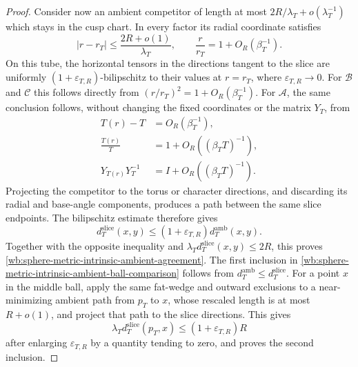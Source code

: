 \begin{proof}
Consider now an ambient competitor of length at most
\(2R/\lambda_T+o(\lambda_T^{-1})\) which stays in the cusp chart.  In every
factor its radial coordinate satisfies
\[
 |r-r_T|\leq \frac{2R+o(1)}{\lambda_T},
 \qquad
 \frac r{r_T}=1+O_R(\beta_T^{-1}).
\]
On this tube, the horizontal tensors in the directions tangent to the slice
are uniformly \((1+\varepsilon_{T,R})\)-bilipschitz to their values at
\(r=r_T\), where \(\varepsilon_{T,R}\to0\).  For
\(\mathcal B\) and \(\mathcal C\) this follows directly from
\((r/r_T)^2=1+O_R(\beta_T^{-1})\).  For \(\mathcal A\), the same conclusion
follows, without changing the fixed coordinates or the matrix \(Y_T\), from
\[
 \begin{aligned}
  T(r)-T&=O_R(\beta_T^{-1}),\\
  \frac{T(r)}T&=1+O_R((\beta_TT)^{-1}),\\
  Y_{T(r)}Y_T^{-1}&=I+O_R((\beta_TT)^{-1}).
 \end{aligned}
\]
Projecting the competitor to the torus or character directions, and
discarding its radial and base-angle components, produces a path between
the same slice endpoints.  The bilipschitz estimate therefore gives
\[
 d_T^{\mathrm{slice}}(x,y)
 \leq(1+\varepsilon_{T,R})d_T^{\mathrm{amb}}(x,y).
\]
Together with the opposite inequality and
\(\lambda_Td_T^{\mathrm{slice}}(x,y)\leq2R\), this proves
\eqref{wb:sphere-metric-intrinsic-ambient-agreement}.  The first inclusion in
\eqref{wb:sphere-metric-intrinsic-ambient-ball-comparison} follows from
\(d_T^{\mathrm{amb}}\leq d_T^{\mathrm{slice}}\).  For a point \(x\) in
the middle ball, apply the same fat-wedge and outward exclusions to a
near-minimizing ambient path from \(p_T\) to \(x\), whose rescaled length is
at most \(R+o(1)\), and project that path to the slice directions.  This
gives
\[
 \lambda_Td_T^{\mathrm{slice}}(p_T,x)
 \leq(1+\varepsilon_{T,R})R
\]
after enlarging \(\varepsilon_{T,R}\) by a quantity tending to zero, and
proves the second inclusion.


\end{proof}
